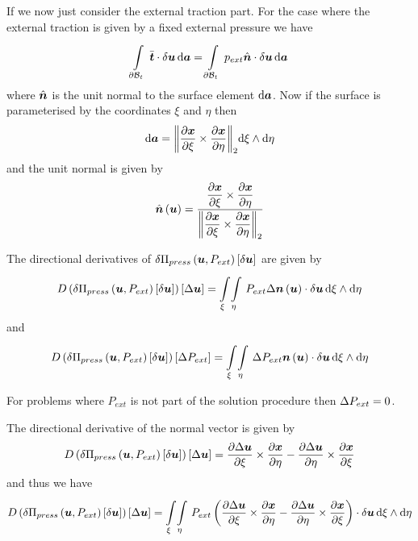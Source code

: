 If we now just consider the external traction part. For the case where the
external traction is given by a fixed external pressure we have
\begin{equation}
  \gint{\boundary{\embedmanifold{B}}_{t}}{}{\dotprod{\bar{\vectr{t}}}{\delta\vectr{u}}}{\covectr{a}}=\gint{\boundary{\embedmanifold{B}}_{t}}{}{\dotprod{p_{ext}\hat{\vectr{n}}}{\delta\vectr{u}}}{\covectr{a}}
\end{equation}
where $\hat{ \boldsymbol{n} }$ is the unit normal to the surface element
$  { \mathrm{d} } \boldsymbol{a}   $. Now if the surface is parameterised by the
coordinates $\xi$ and $\eta$ then
\begin{equation}
    {\ensuremath{ \mathrm{d} }} \boldsymbol{a}   = {\left\|   \dfrac{\partial  \boldsymbol{x} }{\partial \xi}  \times  \dfrac{\partial  \boldsymbol{x} }{\partial \eta}   \right\|_{2}}    { \mathrm{d} }\xi   \wedge   {\ensuremath{ \mathrm{d} }}\eta   
\end{equation}
and the unit normal is given by
\begin{equation}
   \hat{ \boldsymbol{n} }\left(  \boldsymbol{u}  \right) =\dfrac{  \dfrac{\partial  \boldsymbol{x} }{\partial \xi}  \times  \dfrac{\partial  \boldsymbol{x} }{\partial \eta}  }{ {\left\|   \dfrac{\partial  \boldsymbol{x} }{\partial \xi}  \times  \dfrac{\partial  \boldsymbol{x} }{\partial \eta}   \right\|_{2}} }
\end{equation}

The directional derivatives of $   \delta   \Pi_{press}\left(  \boldsymbol{u} ,P_{ext} \right) \left[   \delta   \boldsymbol{u}   \right]  $ are given by
\begin{equation}
  \directionalderiv{}{\variation{\fnof{\Pi_{press}}{\vectr{u},P_{ext}}}{\vectr{u}}}{\linearisationdir{\vectr{u}}}=
  \giint{\xi}{}{\eta}{}{\dotprod{P_{ext}\linearisationdir{\fnof{\vectr{n}}{\vectr{u}}}}{\variationdir{\vectr{u}}}}{\xi}{\eta}
\end{equation}
and
\begin{equation}
  \directionalderiv{}{\variation{\fnof{\Pi_{press}}{\vectr{u},P_{ext}}}{\vectr{u}}}{\linearisationdir{P_{ext}}}=
  \giint{\xi}{}{\eta}{}{\dotprod{\linearisationdir{P_{ext}}\fnof{\vectr{n}}{\vectr{u}}}{\variationdir{\vectr{u}}}}{\xi}{\eta}
\end{equation}
  
For problems where $P_{ext}$ is not part of the solution procedure then
$  \Delta  P_{ext} =0$.

The directional derivative of the normal vector is given by
\begin{equation}
  \directionalderiv{}{\variation{\fnof{\Pi_{press}}{\vectr{u},P_{ext}}}{\vectr{u}}}{\linearisationdir{\vectr{u}}}=
  \crossprod{\delby{\Delta\vectr{u}}{\xi}}{\delby{\vectr{x}}{\eta}}-
  \crossprod{\delby{\Delta\vectr{u}}{\eta}}{\delby{\vectr{x}}{\xi}}
\end{equation}
and thus we have
\begin{equation}
  \directionalderiv{}{\variation{\fnof{\Pi_{press}}{\vectr{u},P_{ext}}}{\vectr{u}}}{\linearisationdir{\vectr{u}}}=
  \giint{\xi}{}{\eta}{}{\dotprod{P_{ext}\pbrac{\crossprod{\delby{\linearisationdir{\vectr{u}}}{\xi}}{\delby{\vectr{x}}{\eta}}-
  \crossprod{\delby{\linearisationdir{\vectr{u}}}{\eta}}{\delby{\vectr{x}}{\xi}}}}{\delta\vectr{u}}}{\xi}{\eta}
\end{equation}

